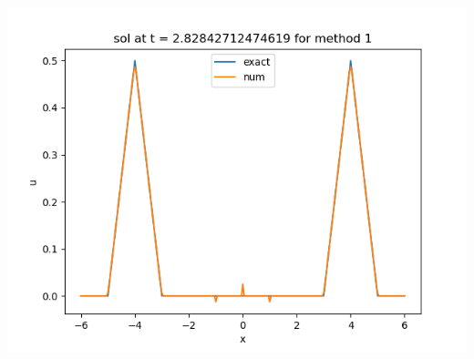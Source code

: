 \documentclass{article}
\begin{document}
\begin{enumerate}[label=(\alph*)]
\begin{center}
	\includegraphics[scale=.3]{hw11 sol n = 80 method 1}
\end{center}


\end{enumerate}
\end{document}
